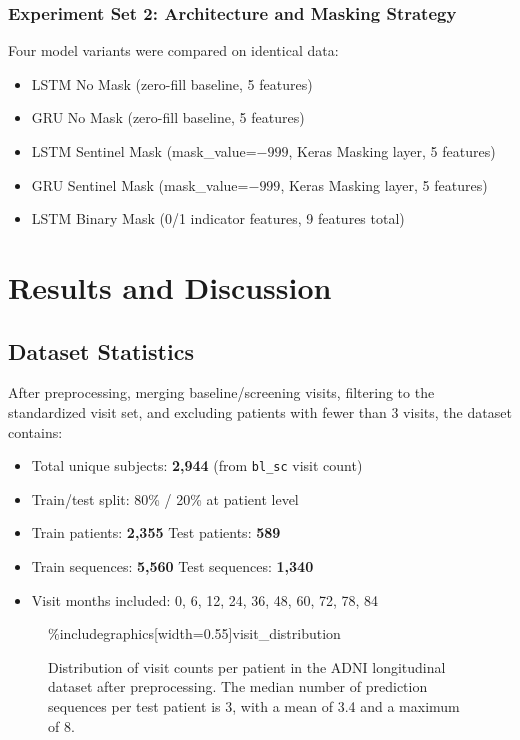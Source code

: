 \documentclass[12pt,singleside,a4paper]{article}
\begin{document}
\subsubsection{Experiment Set 2: Architecture and Masking Strategy}
Four model variants were compared on identical data:
\begin{itemize}
    \item LSTM No Mask (zero-fill baseline, 5 features)
    \item GRU No Mask (zero-fill baseline, 5 features)
    \item LSTM Sentinel Mask (mask\_value=$-999$, Keras Masking layer, 5 features)
    \item GRU Sentinel Mask (mask\_value=$-999$, Keras Masking layer, 5 features)
    \item LSTM Binary Mask (0/1 indicator features, 9 features total)
\end{itemize}

\pagebreak
\section{Results and Discussion}

\subsection{Dataset Statistics}

After preprocessing, merging baseline/screening visits, filtering to the standardized visit set, and excluding patients with fewer than 3 visits, the dataset contains:
\begin{itemize}
    \item Total unique subjects: \textbf{2,944} (from \texttt{bl\_sc} visit count)
    \item Train/test split: 80\% / 20\% at patient level
    \item Train patients: \textbf{2,355} \quad Test patients: \textbf{589}
    \item Train sequences: \textbf{5,560} \quad Test sequences: \textbf{1,340}
    \item Visit months included: 0, 6, 12, 24, 36, 48, 60, 72, 78, 84
\end{itemize}

\begin{figure}[h]
\centering
\%includegraphics[width=0.55\textwidth]{visit_distribution}
\caption{Distribution of visit counts per patient in the ADNI longitudinal dataset after preprocessing. The median number of prediction sequences per test patient is 3, with a mean of 3.4 and a maximum of 8.}
\label{fig:visit_dist}
\end{figure}
\end{document}

